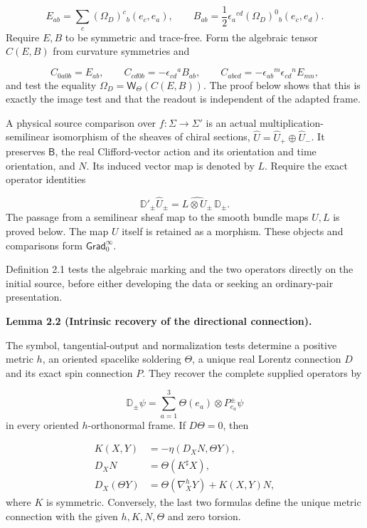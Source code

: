 \documentclass[
  english,
  11pt,
  reqno]{amsart}
\makeatletter
\newcommand{\pandocstatementheading}[1]{%
  \par\addpenalty{\@beginparpenalty}%
  \addvspace{.5\baselineskip plus .2\baselineskip minus .2\baselineskip}%
  {\normalfont\bfseries #1\par}%
  \nobreak\@afterindenttrue\@afterheading
}
\makeatother
\begin{document}
\label{eq:online-intrinsic-electric-magnetic-readout} \[
E_{ab}=\sum_c(\Omega_D)^c{}_b(e_c,e_a),
\qquad
B_{ab}=\frac12\epsilon_a{}^{cd}(\Omega_D)^0{}_b(e_c,e_d).
\] Require \(E,B\) to be symmetric and trace-free. Form the algebraic
tensor \(C(E,B)\) from curvature symmetries and

\label{eq:online-intrinsic-weyl-components} \[
C_{0a0b}=E_{ab},\qquad
C_{cd0b}=-\epsilon_{cd}{}^a B_{ab},\qquad
C_{abcd}=-\epsilon_{ab}{}^m\epsilon_{cd}{}^n E_{mn},
\] and test the equality \(\Omega_D=\mathsf W_\Theta(C(E,B))\). The
proof below shows that this is exactly the image test and that the
readout is independent of the adapted frame.

A physical source comparison over \(f:\Sigma\to\Sigma'\) is an actual
multiplication-semilinear isomorphism of the sheaves of chiral sections,
\(\widehat U=\widehat U_+\oplus\widehat U_-\). It preserves
\(\mathsf B\), the real Clifford-vector action and its orientation and
time orientation, and \(N\). Its induced vector map is denoted by \(L\).
Require the exact operator identities

\label{eq:online-intrinsic-gradient-intertwining} \[
\mathbb D'_\pm\widehat U_\pm
=\widehat{L\otimes U_\pm}\,\mathbb D_\pm.
\] The passage from a semilinear sheaf map to the smooth bundle maps
\(U,L\) is proved below. The map \(U\) itself is retained as a morphism.
These objects and comparisons form \(\mathsf{Grad}_0^\infty\).

Definition 2.1 tests the algebraic marking and the two operators
directly on the initial source, before either developing the data or
seeking an ordinary-pair presentation.

\pandocstatementheading{\leavevmode{}\label{lem:online-intrinsic-gradient-decoder}Lemma 2.2 (Intrinsic recovery of the directional connection).}

The symbol, tangential-output and normalization tests determine a
positive metric \(h\), an oriented spacelike soldering \(\Theta\), a
unique real Lorentz connection \(D\) and its exact spin connection
\(P\). They recover the complete supplied operators by

\label{eq:online-intrinsic-uncontracted-recovery} \[
\mathbb D_\pm\psi
=\sum_{a=1}^3\Theta(e_a)\otimes P^\pm_{e_a}\psi
\] in every oriented \(h\)-orthonormal frame. If \(D\Theta=0\), then

\label{eq:online-intrinsic-gauss-weingarten} \[
\begin{aligned}
K(X,Y)&=-\eta(D_XN,\Theta Y),\\
D_XN&=\Theta(K^\sharp X),\\
D_X(\Theta Y)&=\Theta(\nabla_X^hY)+K(X,Y)N,
\end{aligned}
\] where \(K\) is symmetric. Conversely, the last two formulas define
the unique metric connection with the given \(h,K,N,\Theta\) and zero
torsion.
\end{document}
